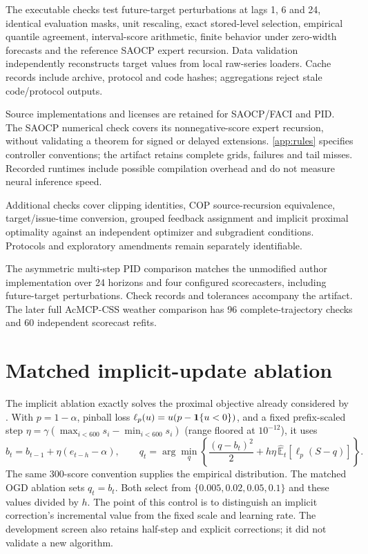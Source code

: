 The executable checks test future-target perturbations at lags 1, 6 and 24, identical
evaluation masks, unit rescaling, exact stored-level selection, empirical quantile
agreement, interval-score arithmetic, finite behavior under zero-width forecasts and
the reference SAOCP expert recursion. Data validation independently reconstructs target
values from local raw-series loaders. Cache records include archive, protocol and code
hashes; aggregations reject stale code/protocol outputs.

Source implementations and licenses are retained for SAOCP/FACI and PID. The SAOCP
numerical check covers its nonnegative-score expert recursion, without validating a
theorem for signed or delayed extensions. \ref{app:rules} specifies controller
conventions; the artifact retains complete grids, failures and tail misses. Recorded
runtimes include possible compilation overhead and do not measure neural inference speed.

Additional checks cover clipping identities, COP source-recursion equivalence,
target/issue-time conversion, grouped feedback assignment and implicit proximal
optimality against an independent optimizer and subgradient conditions. Protocols
and exploratory amendments remain separately identifiable.

The asymmetric multi-step PID comparison matches the unmodified author implementation
over 24 horizons and four configured scorecasters, including future-target perturbations.
Check records and tolerances accompany the artifact. The later full AcMCP-CSS
weather comparison has 96 complete-trajectory checks and 60 independent scorecast refits.


\section{Matched implicit-update ablation}\label{app:implicit}
The implicit ablation exactly solves the proximal objective already considered by
\citet{hu2026cop}. With $p=1-\alpha$, pinball loss $\ell_p(u)=u(p-\mathbf{1}\{u<0\})$,
and a fixed prefix-scaled step $\eta=\gamma(\max_{i<600}s_i-\min_{i<600}s_i)$
(range floored at $10^{-12}$), it uses
\begin{equation}\label{eq:prox}
 b_t=b_{t-1}+\eta(e_{t-h}-\alpha),\qquad
 q_t=\arg\min_q\left\{\frac{(q-b_t)^2}{2}
       +h\eta\,\widehat{\mathbb E}_t[\ell_p(S-q)]\right\}.
\end{equation}
The same 300-score convention supplies the empirical distribution. The matched OGD
ablation sets $q_t=b_t$. Both select from $\{0.005,0.02,0.05,0.1\}$ and these values
divided by $h$. The point of this control is to distinguish an implicit correction's
incremental value from the fixed scale and learning rate. The development screen also
retains half-step and explicit corrections; it did not validate a new algorithm.


